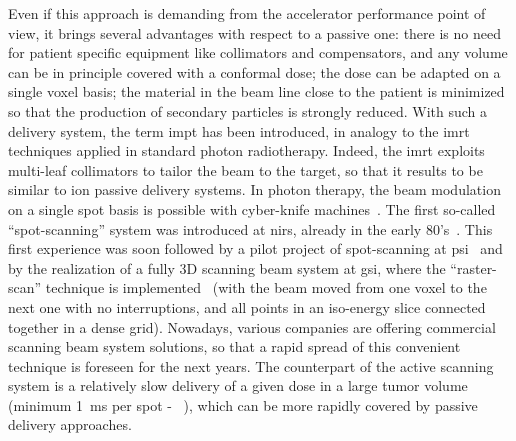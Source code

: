 Even if this approach is demanding from the accelerator performance point of view, it brings several advantages with respect to a passive one: there is no need for patient specific equipment like collimators and compensators, and any volume can be in principle covered with a conformal dose; the dose can be adapted on a single voxel basis; the material in the beam line close to the patient is minimized so that the production of secondary particles is strongly reduced. 
With such a delivery system, the term \gls{impt} has been introduced, in analogy to the \gls{imrt} techniques applied in standard photon radiotherapy. Indeed, the \gls{imrt} exploits multi-leaf collimators to tailor the beam to the target, so that it results to be similar to ion passive delivery systems. In photon therapy, the beam modulation on a single spot basis is possible with cyber-knife machines~\parencite{Srivastava2015}.   
The first so-called \enquote{spot-scanning} system was introduced at \gls{nirs}, already in the early 80's~\parencite{Kanai1983}. This first experience was soon followed by a pilot project of spot-scanning at \gls{psi}~\parencite{Pedroni1995} and by the realization of a fully 3D scanning beam system at \gls{gsi}, where the \enquote{raster-scan} technique is implemented~\parencite{Haberer1993} (with the beam moved from one voxel to the next one with no interruptions, and all points in an iso-energy slice connected together in a dense grid). 
Nowadays, various companies are offering commercial scanning beam system solutions, so that a rapid spread of this convenient technique is foreseen for the next years. The counterpart of the active scanning system is a relatively slow delivery of a given dose in a large tumor volume (minimum 1~ms per spot - ~\cite{Durante2016}), which can be more rapidly covered by passive delivery approaches.  
 

